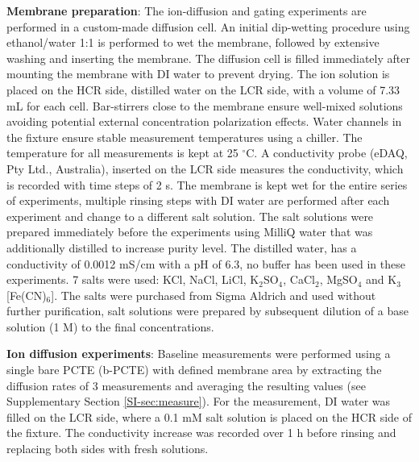 \documentclass[journal=nalefd,email=true, hyperref=true, keywords=false]{achemso}
\begin{document}
\vspace{1em}
\noindent
\textbf{Membrane preparation}: The ion-diffusion and gating experiments are
performed in a custom-made diffusion cell. An initial dip-wetting
procedure using ethanol/water 1:1 is performed to wet the membrane,
followed by extensive washing and inserting the membrane. The
diffusion cell is filled immediately after mounting the membrane with
DI water to prevent drying. The ion solution is placed on the HCR
side, distilled water on the LCR side, with a volume of 7.33 mL for
each cell. Bar-stirrers close to the membrane ensure well-mixed
solutions avoiding potential external concentration polarization
effects. Water channels in the fixture ensure stable measurement
temperatures using a chiller. The temperature for all measurements is
kept at 25 $^{\circ}$C. A conductivity probe (eDAQ, Pty Ltd.,
Australia), inserted on the LCR side measures the conductivity, which
is recorded with time steps of 2 s. The membrane is kept wet for the
entire series of experiments, multiple rinsing steps with DI water are
performed after each experiment and change to a different salt
solution. The salt solutions were prepared immediately before the
experiments using MilliQ water that was additionally distilled to
increase purity level. The distilled water, has a conductivity of
0.0012 mS/cm with a pH of 6.3, no buffer has been used in these
experiments. 7 salts were used: KCl, NaCl, LiCl, K$_{2}$SO$_{4}$,
CaCl$_{2}$, MgSO$_{4}$ and K$_{3}$[Fe(CN)$_{6}$]. The salts were
purchased from Sigma Aldrich and used without further purification,
salt solutions were prepared by subsequent dilution of a base solution
(1 M) to the final concentrations.

\vspace{1em}
\noindent
\textbf{Ion diffusion experiments}: { Baseline measurements were
performed using a single bare PCTE (b-PCTE) with defined membrane area} by extracting the diffusion rates
of 3 measurements and averaging the resulting values (see
Supplementary Section \ref{SI-sec:measure}). For the measurement, DI water was filled on
the LCR side, where a 0.1 mM salt solution is placed on the HCR side
of the fixture. The conductivity increase was recorded over 1 h before
rinsing and replacing both sides with fresh solutions.
\end{document}
